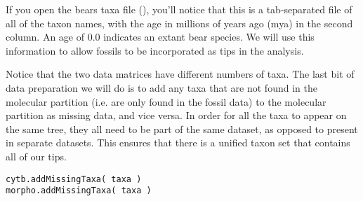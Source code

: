 If you open the bears taxa file (), you'll notice that this is a tab-separated file of all of the taxon names, with the age in millions of years ago (mya) in the second column. 
An age of 0.0 indicates an extant bear species. 
We will use this information to allow fossils to be incorporated as tips in the analysis. 

Notice that the two data matrices have different numbers of taxa. The last bit of data preparation we will do is to add any taxa that are not found in the molecular partition (i.e. are only found in the fossil data) to the molecular partition as missing data, and vice versa.
In order for all the taxa to appear on the same tree, they all need to be part of the same dataset, as opposed to present in separate datasets. 
This ensures that there is a unified taxon set that contains all of our tips.

{\tt \begin{snugshade*}
\begin{lstlisting}
cytb.addMissingTaxa( taxa )
morpho.addMissingTaxa( taxa )
\end{lstlisting}
\end{snugshade*}}


